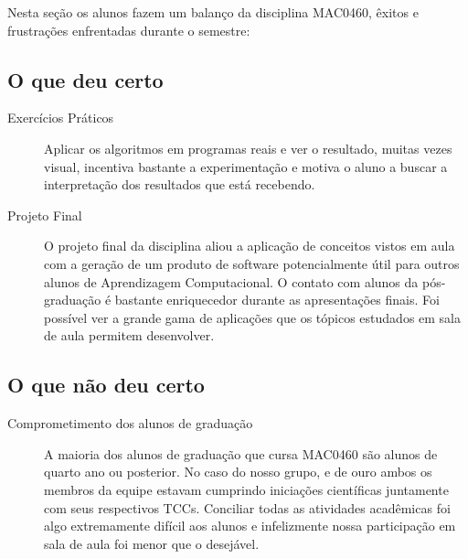 \documentclass[brazil, a4paper]{article}
\begin{document}
Nesta seção os alunos fazem um balanço da disciplina MAC0460, êxitos e
frustrações enfrentadas durante o semestre:

\subsection{O que deu certo}

\begin{description}
	\item[Exercícios Práticos] Aplicar os algoritmos em programas reais e ver 
	o resultado, muitas vezes visual, incentiva bastante a experimentação e
	motiva o aluno a buscar a interpretação dos resultados que está recebendo.

    \item[Projeto Final] O projeto final da disciplina aliou a aplicação de
	conceitos vistos em aula com a geração de um produto de software potencialmente
	útil para outros alunos de Aprendizagem Computacional. O contato com alunos
	da pós-graduação é bastante enriquecedor durante as apresentações finais.
	Foi possível ver a grande gama de aplicações que os tópicos estudados em
	sala de aula permitem desenvolver.

\end{description}

\subsection{O que não deu certo}

\begin{description}

	\item[Comprometimento dos alunos de graduação] A maioria dos alunos de graduação que cursa
	MAC0460 são alunos de quarto ano ou posterior. No caso do nosso
	grupo, e de ouro ambos os membros da equipe estavam cumprindo iniciações
	científicas juntamente com seus respectivos TCCs. Conciliar todas as
	atividades acadêmicas foi algo extremamente difícil aos alunos e infelizmente
	nossa participação em sala de aula foi menor que o desejável.

\end{description}
\end{document}

